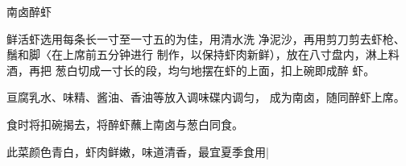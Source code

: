 \begin{recipe}{南卤醉虾}

\ingredients


\cooking

\step 鲜活虾选用每条长一寸至一寸五的为佳，用清水洗 净泥沙，再用剪刀剪去虾枪、鬚和脚〈在上席前五分钟进行 制作，以保持虾肉新鲜），放在八寸盘内，淋上料酒，再把 葱白切成一寸长的段，均勻地摆在虾的上面，扣上碗即成醉 虾。

\step 亘腐乳水、味精、酱油、香油等放入调味碟内调匀， 成为南卤，随同醉虾上席。

\step 食时将扣碗揭去，将醉虾蘸上南卤与葱白同食。

\notes

此菜颜色青白，虾肉鲜嫩，味道清香，最宜夏季食用|

\end{recipe}

